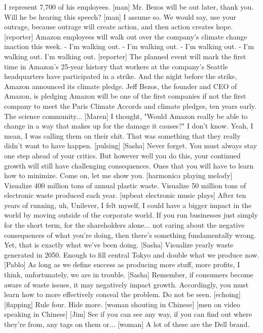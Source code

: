 \documentclass[a4paper]{article}
\begin{document}
	I represent 7,700 of his employees.
	[man] Mr. Bezos will be out later, thank you.
	Will he be hearing this speech?
	[man] I assume so.
	We would say, use your outrage,
	because outrage will create action,
	and then action creates hope.
	[reporter] Amazon employees will walk out over
	the company's climate change inaction this week.
	- I'm walking out. - I'm walking out.
	- I'm walking out. - I'm walking out.
	I'm walking out.
	[reporter] The planned event will mark
	the first time in Amazon's 25-year history
	that workers at the company's Seattle headquarters
	have participated in a strike.
	And the night before the strike, Amazon announced its climate pledge.
	Jeff Bezos, the founder and CEO of Amazon, is pledging Amazon
	will be one of the first companies if not the first company
	to meet the Paris Climate Accords and climate pledges, ten years early.
	The science community...
	[Maren] I thought, "Would Amazon really be able to change in a way that makes up
	for the damage it causes?"
	I don't know.
	Yeah, I mean, I was calling them on their shit.
	That was something that they really didn't want to have happen.
	[pulsing]
	[Sasha] Never forget.
	You must always stay one step ahead of your critics.
	But however well you do this, your continued growth
	will still have challenging consequences.
	Ones that you will have to learn how to minimize.
	Come on, let me show you.
	[harmonica playing melody]
	Visualize 400 million tons of annual plastic waste.
	Visualize 50 million tons of electronic waste produced each year.
	[upbeat electronic music plays]
	After ten years of running, uh, Unilever,
	I felt myself, I could have a bigger impact in the world
	by moving outside of the corporate world.
	If you run businesses just simply for the short term,
	for the shareholders alone...
	not caring about the negative consequences of what you're doing,
	then there's something fundamentally wrong.
	Yet, that is exactly what we've been doing.
	[Sasha] Visualize yearly waste generated in 2050.
	Enough to fill central Tokyo and double what we produce now.
	[Pablo] As long as we define success as producing more stuff,
	more profits, I think, unfortunately,
	we are in trouble.
	[Sasha] Remember, if consumers become aware of waste issues,
	it may negatively impact growth.
	Accordingly, you must learn how to more effectively conceal the problem.
	Do not be seen. [echoing]
	[flapping]
	Rule four. Hide more.
	[woman shouting in Chinese]
	[men on video speaking in Chinese]
	[Jim] See if you can see any way,
	if you can find out where they're from, any tags on them or...
	[woman] A lot of these are the Dell brand.
\end{document}
